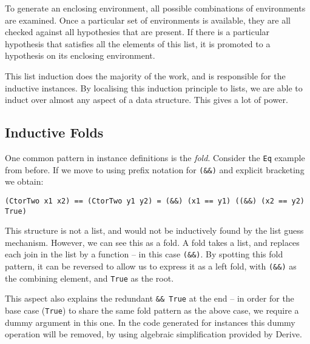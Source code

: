 \documentclass{llncs}
\newcommand{\T}[1]{\texttt{#1}}
\begin{document}
To generate an enclosing environment, all possible combinations of environments are examined. Once a particular set of environments is available, they are all checked against all hypothesies that are present. If there is a particular hypothesis that satisfies all the elements of this list, it is promoted to a hypothesis on its enclosing environment.

This list induction does the majority of the work, and is responsible for the inductive instances. By localising this induction principle to lists, we are able to induct over almost any aspect of a data structure. This gives a lot of power.

\subsection{Inductive Folds}

One common pattern in instance definitions is the \textit{fold}. Consider the \T{Eq} example from before. If we move to using prefix notation for \verb"(&&)" and explicit bracketing we obtain:

\begin{verbatim}
(CtorTwo x1 x2) == (CtorTwo y1 y2) = (&&) (x1 == y1) ((&&) (x2 == y2) True)
\end{verbatim}

This structure is not a list, and would not be inductively found by the list guess mechanism. However, we can see this as a fold. A fold takes a list, and replaces each join in the list by a function -- in this case \verb"(&&)". By spotting this fold pattern, it can be reversed to allow us to express it as a left fold, with \verb"(&&)" as the combining element, and \T{True} as the root.

This aspect also explains the redundant \verb"&& True" at the end -- in order for the base case (\T{True}) to share the same fold pattern as the above case, we require a dummy argument in this one. In the code generated for instances this dummy operation will be removed, by using algebraic simplification provided by Derive.
\end{document}
